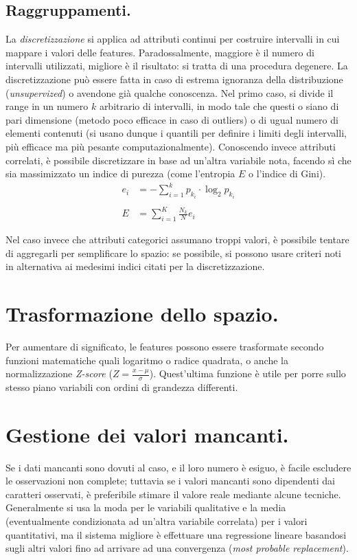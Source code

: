 \documentclass[11pt, a4page, twocolumn]{article}
\begin{document}
\subsection{Raggruppamenti.}
La \textit{discretizzazione} si applica ad attributi continui per costruire intervalli in cui mappare i valori delle features.
Paradossalmente, maggiore è il numero di intervalli utilizzati, migliore è il risultato: si tratta di una procedura degenere.
La discretizzazione può essere fatta in caso di estrema ignoranza della distribuzione (\textit{unsupervized}) o avendone già qualche conoscenza.
Nel primo caso, si divide il range in un numero $k$ arbitrario di intervalli, in modo tale che questi o siano di pari dimensione (metodo poco efficace in caso di outliers) o di ugual numero di elementi contenuti (si usano dunque i quantili per definire i limiti degli intervalli, più efficace ma più pesante computazionalmente).
Conoscendo invece attributi correlati, è possibile discretizzare in base ad un'altra variabile nota, facendo sì che sia massimizzato un indice di purezza (come l'entropia $E$ o l'indice di Gini).
\begin{align*}
  e_i &= -\sum^k_{i=1}{p_{k_i} \cdot \log_2{p_{k_i}}} \\ \\
  E &= \sum^K_{i=1}{\frac{N_k}{N} e_i}
\end{align*}

Nel caso invece che attributi categorici assumano troppi valori, è possibile tentare di aggregarli per semplificare lo spazio: se possibile, si possono usare criteri noti in alternativa ai medesimi indici citati per la discretizzazione.

\section{Trasformazione dello spazio.}
Per aumentare di significato, le features possono essere trasformate secondo funzioni matematiche quali logaritmo o radice quadrata, o anche la normalizzazione \textit{Z-score} ($Z = \frac{x - \mu}{\sigma}$).
Quest'ultima funzione è utile per porre sullo stesso piano variabili con ordini di grandezza differenti.


\section{Gestione dei valori mancanti.}
Se i dati mancanti sono dovuti al caso, e il loro numero è esiguo, è facile escludere le osservazioni non complete; tuttavia se i valori mancanti sono dipendenti dai caratteri osservati, è preferibile stimare il valore reale mediante alcune tecniche.
Generalmente si usa la moda per le variabili qualitative e la media (eventualmente condizionata ad un'altra variabile correlata) per i valori quantitativi, ma il sistema migliore è effettuare una regressione lineare basandosi sugli altri valori fino ad arrivare ad una convergenza (\textit{most probable replacement}).
\end{document}
